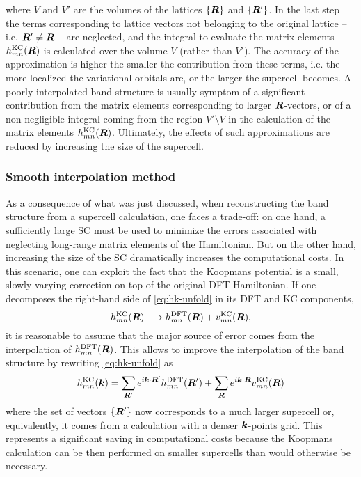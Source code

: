 where $V$ and $V'$ are the volumes of the lattices $\{ {\bm R} \}$ and $\{ {\bm R}' \}$. In the last step the terms corresponding to lattice vectors not belonging to the original lattice -- i.e. ${\bm R}' \neq {\bm R}$ -- are neglected, and the integral to evaluate the matrix elements $h^{\rm KC}_{mn}({\bm R})$ is calculated over the volume $V$ (rather than $V'$). The accuracy of the approximation is higher the smaller the contribution from these terms, i.e. the more localized the variational orbitals are, or the larger the supercell becomes. A poorly interpolated band structure is usually symptom of a significant contribution from the matrix elements corresponding to larger ${\bm R}$-vectors, or of a non-negligible integral coming from the region $V' \setminus V$ in the calculation of the matrix elements $h^{\rm KC}_{mn}({\bm R})$. Ultimately, the effects of such approximations are reduced by increasing the size of the supercell.

\subsubsection*{Smooth interpolation method}
As a consequence of what was just discussed, when reconstructing the band structure from a supercell calculation, one faces a trade-off: on one hand, a sufficiently large SC must be used to minimize the errors associated with neglecting long-range matrix elements of the Hamiltonian. But on the other hand, increasing the size of the SC dramatically increases the computational costs. In this scenario, one can exploit the fact that the Koopmans potential is a small, slowly varying correction on top of the original DFT Hamiltonian. If one decomposes the right-hand side of \cref{eq:hk-unfold} in its DFT and KC components,
%
\begin{equation}
    h^{\rm KC}_{mn}({\bm R}) \longrightarrow h^{\rm DFT}_{mn}({\bm R}) + v^{\rm KC}_{mn}({\bm R}) ,
\end{equation}
%
it is reasonable to assume that the major source of error comes from the interpolation of $h^{\rm DFT}_{mn}({\bm R})$. This allows to improve the interpolation of the band structure by rewriting \cref{eq:hk-unfold} as
%
\begin{equation}
    h^{\rm KC}_{mn}({\bm k}) = \sum_{{\bm R}'} e^{i {\bm k} \cdot {\bm R}'} h^{\rm DFT}_{mn}({\bm R}') + \sum_{{\bm R}} e^{i {\bm k} \cdot {\bm R}} v^{\rm KC}_{mn}({\bm R})
    \label{eq:hk-smooth}
\end{equation}
%
where the set of vectors $\{ {\bm R}' \}$ now corresponds to a much larger supercell or, equivalently, it comes from a calculation with a denser ${\bm k}$-points grid. This represents a significant saving in computational costs because the Koopmans calculation can be then performed on smaller supercells than would otherwise be necessary.

